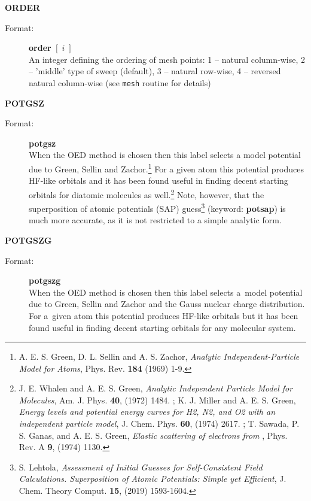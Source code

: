 \documentclass[12pt,a4paper]{article}
\newcommand{\ft}[1]{\texttt{#1}}
\begin{document}
\begin{description}
\item \textbf{ORDER}
\begin{description}
\item[Format:] \textbf{order} $[\;i\;]$\\ An integer defining the ordering of mesh points:
  1 -- natural column-wise, 2 -- 'middle' type of sweep (default), 3 -- natural
  row-wise, 4 -- reversed natural column-wise (see \ft{mesh} routine for details)
\end{description}



\item \textbf{POTGSZ}
\begin{description}
\item[Format:] \textbf{potgsz} \\ When the OED method is chosen then
  this label selects a model potential due to Green, Sellin and
  Zachor.\footnote{A. E. S. Green, D. L. Sellin and A. S. Zachor,
    \textsl{Analytic Independent-Particle Model for Atoms},
    Phys. Rev. \textbf{184} (1969) 1-9. }
  For a given atom this potential produces HF-like orbitals and it has
  been found useful in finding decent starting orbitals for diatomic
  molecules as well.\footnote{J. E. Whalen and A. E. S. Green,
    \textsl{Analytic Independent Particle Model for Molecules},
    Am. J. Phys. \textbf{40}, (1972) 1484. ;
    K. J. Miller and A. E. S. Green, \textsl{Energy levels and
      potential energy curves for H2, N2, and O2 with an independent
      particle model}, J. Chem. Phys. \textbf{60}, (1974)
    2617. ; T. Sawada, P. S. Ganas, and
    A. E. S. Green, \textsl{Elastic scattering of electrons from
      }, Phys. Rev. A \textbf{9}, (1974)
    1130. } Note, however, that the
  superposition of atomic potentials (SAP) guess\footnote{S. Lehtola,
    \textsl{Assessment of Initial Guesses for Self-Consistent Field
      Calculations. Superposition of Atomic Potentials: Simple yet
      Efficient}, J. Chem. Theory Comput. \textbf{15}, (2019)
    1593-1604. } (keyword:
  \textbf{potsap}) is much more accurate, as it is not restricted to a
  simple analytic form.
\end{description}


\item \textbf{POTGSZG}
\begin{description}
\item[Format:] \textbf{potgszg} \\ When the OED method is chosen then
  this label selects a~model potential due to Green, Sellin and Zachor
  and the Gauss nuclear charge distribution. For a~given atom this
  potential produces HF-like orbitals but it has been found useful in
  finding decent starting orbitals for any molecular system.
\end{description}



\end{description}
\end{document}
